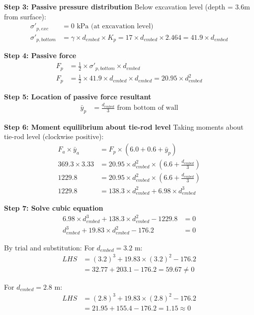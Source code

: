 \documentclass[10pt,a4paper,twocolumn]{article}
\begin{document}
\textbf{Step 3: Passive pressure distribution}
Below excavation level (depth = 3.6m from surface):
\begin{align}
\sigma'_{p,exc} &= 0 \text{ kPa (at excavation level)} \\
\sigma'_{p,bottom} &= \gamma \times d_{embed} \times K_p = 17 \times d_{embed} \times 2.464 = 41.9 \times d_{embed}
\end{align}

\textbf{Step 4: Passive force}
\begin{align}
F_p &= \frac{1}{2} \times \sigma'_{p,bottom} \times d_{embed} \\
F_p &= \frac{1}{2} \times 41.9 \times d_{embed} \times d_{embed} = 20.95 \times d_{embed}^2
\end{align}

\textbf{Step 5: Location of passive force resultant}
\begin{align}
\bar{y}_p &= \frac{d_{embed}}{3} \text{ from bottom of wall}
\end{align}

\textbf{Step 6: Moment equilibrium about tie-rod level}
Taking moments about tie-rod level (clockwise positive):
\begin{align}
F_a \times \bar{y}_a &= F_p \times (6.0 + 0.6 + \bar{y}_p) \\
369.3 \times 3.33 &= 20.95 \times d_{embed}^2 \times (6.6 + \frac{d_{embed}}{3}) \\
1229.8 &= 20.95 \times d_{embed}^2 \times (6.6 + \frac{d_{embed}}{3}) \\
1229.8 &= 138.3 \times d_{embed}^2 + 6.98 \times d_{embed}^3
\end{align}

\textbf{Step 7: Solve cubic equation}
\begin{align}
6.98 \times d_{embed}^3 + 138.3 \times d_{embed}^2 - 1229.8 &= 0 \\
d_{embed}^3 + 19.83 \times d_{embed}^2 - 176.2 &= 0
\end{align}

By trial and substitution:
For $d_{embed} = 3.2$ m:
\begin{align}
LHS &= (3.2)^3 + 19.83 \times (3.2)^2 - 176.2 \\
&= 32.77 + 203.1 - 176.2 = 59.67 \neq 0
\end{align}

For $d_{embed} = 2.8$ m:
\begin{align}
LHS &= (2.8)^3 + 19.83 \times (2.8)^2 - 176.2 \\
&= 21.95 + 155.4 - 176.2 = 1.15 \approx 0
\end{align}
\end{document}
